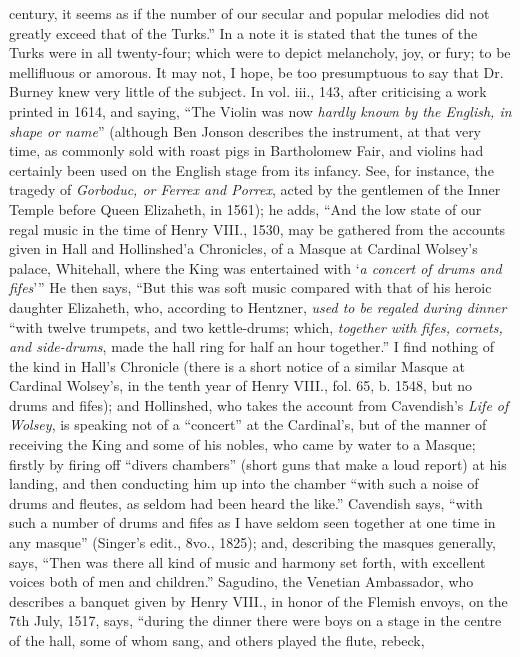 {century, it seems as if the number of our secular and
popular melodies did not greatly exceed that of the Turks.”
In a note it is stated that the tunes of the Turks were in
all twenty-four; which were to depict melancholy, joy, or
fury; to be mellifluous or amorous. It may not, I hope,
be too presumptuous to say that Dr. Burney knew very
little of the subject. In vol. iii., 143, after criticising a
work printed in 1614, and saying, “The Violin was now
\textit{hardly known by the English, in shape or name}” (although
Ben Jonson describes the instrument, at that very time,
as commonly sold with roast pigs in Bartholomew Fair,
and violins had certainly been used on the English
stage from its infancy. See, for instance, the tragedy of
\textit{Gorboduc, or Ferrex and Porrex}, acted by the gentlemen
of the Inner Temple before Queen Elizaheth, in 1561);
he adds, “And the low state of our regal music
in the time of Henry VIII., 1530, may be gathered
from the accounts given in Hall and Hollinshed’a
Chronicles, of a Masque at Cardinal Wolsey’s palace,
Whitehall, where the King was entertained with ‘\textit{a concert
of drums and fifes}’” He then says, “But this was
soft music compared with that of his heroic daughter
Elizaheth, who, according to Hentzner, \textit{used to be regaled
during dinner} “with twelve trumpets, and two kettle-drums; 
which, \textit{together with fifes, cornets, and side-drums},
made the hall ring for half an hour together.” I find
nothing of the kind in Hall’s Chronicle (there is a short
notice of a similar Masque at Cardinal Wolsey’s, in the
tenth year of Henry VIII., fol. 65, b. 1548, but no drums
and fifes); and Hollinshed, who takes the account from
Cavendish’s \textit{Life of Wolsey}, is speaking not of a “concert”
at the Cardinal’s, but of the manner of receiving the King
and some of his nobles, who came by water to a Masque;
firstly by firing off “divers chambers” (short guns that
make a loud report) at his landing, and then conducting
him up into the chamber “with such a noise of drums
and fleutes, as seldom had been heard the like.” Cavendish
says, “with such a number of drums and fifes as
I have seldom seen together at one time in any masque”
(Singer’s edit., 8vo., 1825); and, describing the masques
generally, says, “Then was there all kind of music and
harmony set forth, with excellent voices both of men and
children.” Sagudino, the Venetian Ambassador, who
describes a banquet given by Henry VIII., in honor of
the Flemish envoys, on the 7th July, 1517, says, “during
the dinner there were boys on a stage in the centre of the
hall, some of whom sang, and others played the flute, rebeck, 
}
